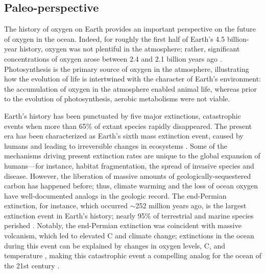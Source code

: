 \documentclass{report_chapter}
\begin{document}
\subsection{Paleo-perspective}

The history of oxygen on Earth provides an important perspective on the future of oxygen in the ocean.
Indeed, for roughly the first half of Earth's 4.5 billion-year history, oxygen was not plentiful in the atmosphere; rather, significant concentrations of oxygen arose between 2.4 and 2.1 billion years ago \citep{Lyons-Reinhard-etal-2014}.
Photosynthesis is the primary source of oxygen in the atmosphere, illustrating how the evolution of life is intertwined with the character of Earth's environment: the accumulation of oxygen in the atmosphere enabled animal life, whereas prior to the evolution of photosynthesis, aerobic metabolisms were not viable.

Earth's history has been punctuated by five major extinctions, catastrophic events when more than 65\% of extant species rapidly disappeared.
The present era has been characterized as Earth's sixth mass extinction event, caused by humans and leading to irreversible changes in ecosystems \citep{Barnosky-Matzke-etal-2011}.
Some of the mechanisms driving present extinction rates are unique to the global expansion of humans---for instance, habitat fragmentation, the spread of invasive species and disease.
However, the liberation of massive amounts of geologically-sequestered carbon has happened before; thus, climate warming and the loss of ocean oxygen have well-documented analogs in the geologic record.
The end-Permian extinction, for instance, which occurred $\sim$252 million years ago, is the largest extinction event in Earth's history; nearly 95\% of terrestrial and marine species perished \citep{Raup-1979,Erwin-1993}.
Notably, the end-Permian extinction was coincident with massive volcanism, which led to elevated C\OO{} and climate change; extinctions in the ocean during this event can be explained by changes in oxygen levels, C\OO{}, and temperature \citep{Song-Wignall-etal-2014}, making this catastrophic event a compelling analog for the ocean of the 21st century \citep{Payne-Clapham-2012}.
\end{document}
